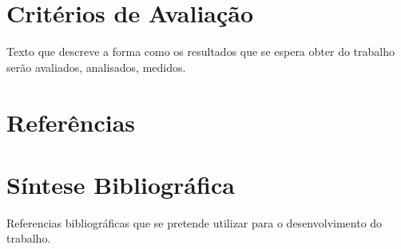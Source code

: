 \documentclass[
    12pt,               %
    a4paper,            %
    english,            %
    brazil,             %
    ]{article}
\begin{document}
\section{Critérios de Avaliação}

Texto que descreve a forma como os resultados que se espera obter do trabalho serão avaliados, analisados, medidos.


\section{Referências}

    \vspace{-4.3em}
    \renewcommand\refname{}

    

\section{Síntese Bibliográfica}

Referencias bibliográficas que se pretende utilizar para o desenvolvimento do trabalho.

% 
\end{document}
